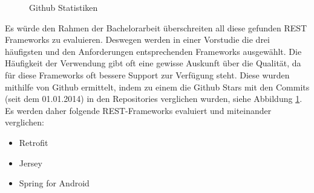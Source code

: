\documentclass[a4paper,11pt,german,public]{INSOexpose}
\begin{document}
\begin{figure}[!htbp]
	\centering	
	\caption{Github Statistiken}	
	\label{figure:github}
\end{figure}

Es würde den Rahmen der Bachelorarbeit überschreiten all diese gefunden REST Frameworks zu evaluieren. Deswegen werden in einer Vorstudie die drei häufigsten und den Anforderungen entsprechenden Frameworks ausgewählt. Die Häufigkeit der Verwendung gibt oft eine gewisse Auskunft über die Qualität, da für diese Frameworks oft bessere Support zur Verfügung steht. Diese wurden mithilfe von Github ermittelt, indem zu einem die Github Stars mit den Commits (seit dem 01.01.2014)  in den Repositories verglichen wurden, siehe Abbildung \ref{figure:github}. Es werden daher folgende REST-Frameworks evaluiert und miteinander verglichen:

\begin{itemize}
	\item Retrofit 
	\item Jersey
	\item Spring for Android
\end{itemize}

\end{document}
